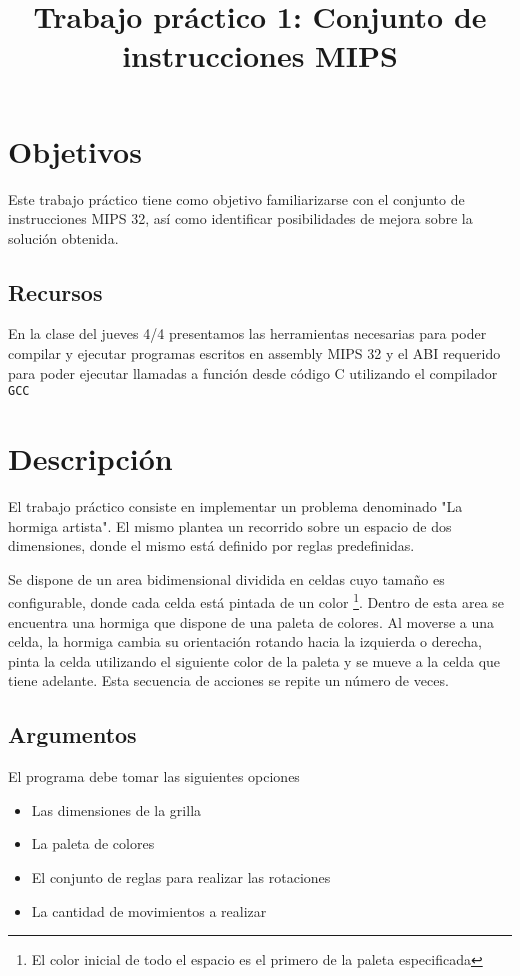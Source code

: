 \documentclass{article}
\title{Trabajo práctico 1: Conjunto de instrucciones MIPS}
\begin{document}
\date{}
\maketitle
\section{Objetivos}
Este trabajo práctico tiene como objetivo familiarizarse con el conjunto de instrucciones
MIPS 32, así como identificar posibilidades de mejora sobre la solución obtenida.

\subsection{Recursos}
En la clase del jueves 4/4 presentamos las herramientas necesarias para poder compilar y ejecutar
programas escritos en assembly MIPS 32 y el ABI requerido para poder ejecutar llamadas a 
función desde código C utilizando el compilador \texttt{GCC}


\section{Descripción}
El trabajo práctico consiste en implementar un problema denominado "La hormiga artista". El mismo plantea un recorrido
sobre un espacio de dos dimensiones, donde el mismo está definido por reglas predefinidas.

Se dispone de un area bidimensional dividida en celdas cuyo tamaño es configurable, donde cada celda está pintada de un color 
\footnote{El color inicial de todo el espacio es el primero de la paleta especificada}. Dentro de esta area se encuentra una
hormiga que dispone de una paleta de colores. Al moverse a una celda, la hormiga cambia su orientación rotando hacia la izquierda o 
derecha, pinta la celda utilizando el siguiente color de la paleta y se mueve a la celda que tiene adelante. Esta secuencia de 
acciones se repite un número de veces.

\subsection{Argumentos}

El programa debe tomar las siguientes opciones
\begin{itemize}
\item Las dimensiones de la grilla
\item La paleta de colores
\item El conjunto de reglas para realizar las rotaciones
\item La cantidad de movimientos a realizar
\end{itemize}
\end{document}
